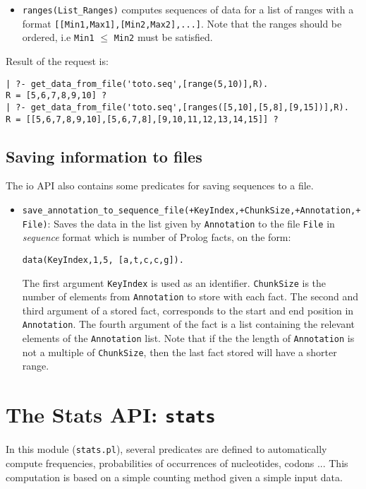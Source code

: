 \documentclass{book}
\begin{document}
\begin{itemize}
\begin{itemize}
\item \verb+ranges(List_Ranges)+ computes sequences of data for a list of ranges with a format \verb+[[Min1,Max1],[Min2,Max2],...]+.
Note that the ranges should be ordered, i.e \verb+Min1+ $\leq$ \verb+Min2+ must be satisfied.
\end{itemize}           
Result of the request is:
\begin{verbatim}
| ?- get_data_from_file('toto.seq',[range(5,10)],R).
R = [5,6,7,8,9,10] ?
| ?- get_data_from_file('toto.seq',[ranges([5,10],[5,8],[9,15])],R).
R = [[5,6,7,8,9,10],[5,6,7,8],[9,10,11,12,13,14,15]] ?
\end{verbatim}
\end{itemize}

\subsection{Saving information to files}

The io API also contains some predicates for saving sequences to a
file. 

\begin{itemize}
\item
  \texttt{save\_annotation\_to\_sequence\_file(+KeyIndex,+ChunkSize,+Annotation,+File)}: 
Saves the data in the list given by \texttt{Annotation} to the file
\texttt{File} in \emph{sequence} format which is number of Prolog facts, on
the form:
\begin{verbatim}
data(KeyIndex,1,5, [a,t,c,c,g]).
\end{verbatim}
The first argument \texttt{KeyIndex} is used as an identifier. \texttt{ChunkSize} is the
number of elements from \texttt{Annotation} to store with each
fact. The second and third argument of a stored fact, corresponds to
the start and end position in \texttt{Annotation}. The fourth
argument of the fact is a list containing the relevant elements of the
\texttt{Annotation} list. Note that if the the length of
\texttt{Annotation} is not a multiple of \texttt{ChunkSize}, then the
last fact stored will have a shorter range.
\end{itemize}

\section{The Stats API: \texttt{stats}}

In this module (\texttt{stats.pl}), several predicates are defined to automatically compute
frequencies, probabilities of occurrences of nucleotides, codons ... This computation
is based on a simple counting method given a simple input data. 
\end{document}
